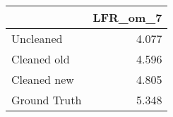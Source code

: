 \begin{tabular}{lr}
\toprule
{} & LFR_om_7 \\
\midrule
Uncleaned    &    4.077 \\
Cleaned old  &    4.596 \\
Cleaned new  &    4.805 \\
Ground Truth &    5.348 \\
\bottomrule
\end{tabular}
